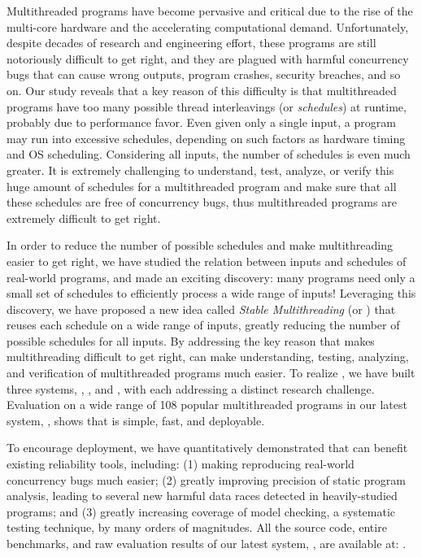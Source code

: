 Multithreaded programs have become pervasive and critical due to the rise of the
multi-core hardware and the accelerating computational demand.
Unfortunately, despite decades of research and engineering effort, these
programs are still notoriously difficult to get right, and they are plagued with
harmful concurrency bugs that can cause wrong outputs, program crashes, security
breaches, and so on. Our study reveals that a key reason of this difficulty is
that multithreaded programs have too many possible thread interleavings (or
\emph{schedules}) at runtime, probably due to performance favor. Even given only a
single input, a program may run into excessive schedules, depending on such
factors as hardware timing and OS scheduling. Considering all inputs, the number
of schedules is even much greater. It is extremely challenging to understand,
test, analyze, or verify this huge amount of schedules for a
multithreaded program and make sure that all these schedules are free of concurrency
bugs, thus multithreaded programs are extremely difficult to get right.

In order to reduce the number of possible schedules and make multithreading
easier to get right, we have studied the
relation between inputs and schedules of real-world programs, and made an
exciting discovery: many programs need only a small set of schedules to
efficiently process a wide range of inputs! Leveraging this discovery, we have
proposed a new idea called \emph{Stable Multithreading} (or \emph{\smt}) that reuses each
schedule on a wide range of inputs, greatly reducing the number of possible
schedules for all inputs. By addressing the key reason that makes multithreading
difficult to get right, \smt can make understanding,
testing, analyzing, and verification of multithreaded programs much
easier. To realize \smt, we have built three \smt systems, \tern,
\peregrine, and \parrot, with each addressing a distinct research challenge.
Evaluation on a wide range of 108 popular multithreaded programs in
our latest \smt system, \parrot, shows that \smt is simple, fast, and
deployable.

To encourage \smt deployment, we have quantitatively demonstrated that \smt 
can benefit existing reliability tools, including: (1) making reproducing
real-world concurrency bugs much easier;  (2) greatly improving precision of
static program analysis, leading to several new harmful data races detected in
heavily-studied programs; and (3) greatly increasing coverage of model checking,
a systematic testing technique, by many orders of magnitudes. All the source
code, entire benchmarks, and raw evaluation results of our latest \smt system,
\parrot, are available at: \github.

